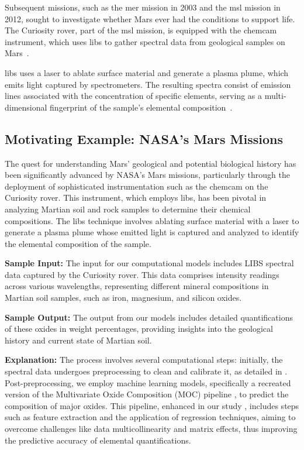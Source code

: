 Subsequent missions, such as the \gls{mer} mission in 2003 and the \gls{msl} mission in 2012, sought to investigate whether Mars ever had the conditions to support life. 
The Curiosity rover, part of the \gls{msl} mission, is equipped with the \gls{chemcam} instrument, which uses \gls{libs} to gather spectral data from geological samples on Mars~\cite{wiensChemcam2012}.

\gls{libs} uses a laser to ablate surface material and generate a plasma plume, which emits light captured by spectrometers. 
The resulting spectra consist of emission lines associated with the concentration of specific elements, serving as a multi-dimensional fingerprint of the sample's elemental composition~\cite{cleggRecalibrationMarsScience2017}.

\subsection{Motivating Example: NASA's Mars Missions}

The quest for understanding Mars' geological and potential biological history has been significantly advanced by NASA's Mars missions, particularly through the deployment of sophisticated instrumentation such as the \gls{chemcam} on the Curiosity rover. This instrument, which employs \gls{libs}, has been pivotal in analyzing Martian soil and rock samples to determine their chemical compositions. The \gls{libs} technique involves ablating surface material with a laser to generate a plasma plume whose emitted light is captured and analyzed to identify the elemental composition of the sample\cite{cleggRecalibrationMarsScience2017}.

\textbf{Sample Input:} The input for our computational models includes LIBS spectral data captured by the Curiosity rover. This data comprises intensity readings across various wavelengths, representing different mineral compositions in Martian soil samples, such as iron, magnesium, and silicon oxides.

\textbf{Sample Output:} The output from our models includes detailed quantifications of these oxides in weight percentages, providing insights into the geological history and current state of Martian soil.

\textbf{Explanation:} The process involves several computational steps: initially, the spectral data undergoes preprocessing to clean and calibrate it, as detailed in \citet{wiensChemcam2012}. Post-preprocessing, we employ machine learning models, specifically a recreated version of the Multivariate Oxide Composition (MOC) pipeline \cite{cleggRecalibrationMarsScience2017}, to predict the composition of major oxides. This pipeline, enhanced in our study \cite{p9_paper}, includes steps such as feature extraction and the application of regression techniques, aiming to overcome challenges like data multicollinearity and matrix effects, thus improving the predictive accuracy of elemental quantifications.

